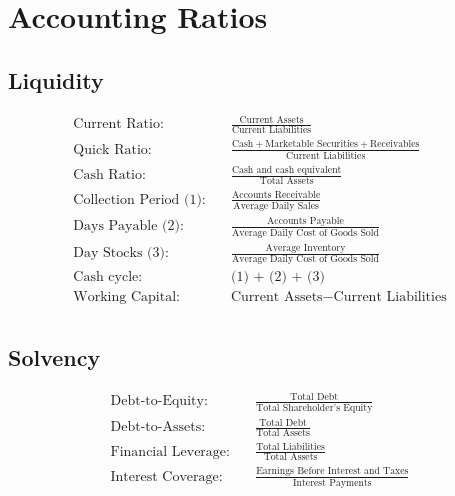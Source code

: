 \documentclass[12pt]{article}
\begin{document}
\section{Accounting Ratios}
	\subsection{Liquidity}
	\begin{tcolorbox}
	\begin{align*}
		\text{Current Ratio:} \quad & \frac{\text{Current Assets}}{\text{Current Liabilities}} \\
		\text{Quick Ratio:} \quad & \frac{\text{Cash} + \text{Marketable Securities} + \text{Receivables}}{\text{Current Liabilities}} \\
		\text{Cash Ratio:} \quad & \frac{\text{Cash and cash equivalent}}{\text{Total Assets}}  \\
		\text{Collection Period (1):} \quad & \frac{\text{Accounts Receivable}}{\text{Average Daily Sales}} \\
		\text{Days Payable (2):} \quad & \frac{\text{Accounts Payable}}{\text{Average Daily Cost of Goods Sold}} \\
		\text{Day Stocks (3):} \quad & \frac{\text{Average Inventory}}{\text{Average Daily Cost of Goods Sold}} \\
		\text{Cash cycle:} \quad & \text{(1) + (2) + (3) } \\
		\text{Working Capital:} \quad & \text{Current Assets} - \text{Current Liabilities} \\
	\end{align*}
	\end{tcolorbox}
	\subsection{Solvency}
	\begin{tcolorbox}
	\begin{align*}
		\text{Debt-to-Equity:} \quad & \frac{\text{Total Debt}}{\text{Total Shareholder's Equity}} \\
		\text{Debt-to-Assets:} \quad & \frac{\text{Total Debt}}{\text{Total Assets}} \\
		\text{Financial Leverage:} \quad & \frac{\text{Total Liabilities}}{\text{Total Assets}} \\
		\text{Interest Coverage:} \quad & \frac{\text{Earnings Before Interest and Taxes}}{\text{Interest Payments}}
	\end{align*}
	\end{tcolorbox}
\end{document}
